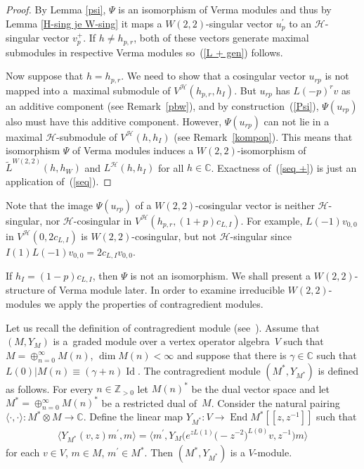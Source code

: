 \documentclass[pdftex]{sigma}
\numberwithin{equation}{section}
\newcommand{\N}{{\mathbb Z}_{> 0} }
\newcommand{\C}{\mathbb C}
\newcommand{\HVir}{\mathcal H}
\begin{document}
\begin{proof}
By Lemma \ref{psi}, $\Psi$ is an isomorphism of Verma modules and thus by Lemma \ref{H-sing je W-sing} it maps a $W(2,2) $-singular vector $u^{\prime}_p$ to an $\HVir$-singular vector $v_p^+$. If $h\neq h_{p,r}$, both of these vectors generate maximal submodules in respective Verma modules so~(\ref{L + gen}) follows.

Now suppose that $h=h_{p,r}$. We need to show that a cosingular vector $u_{rp}$ is not mapped into a~maximal submodule of $V^\HVir(h_{p,r},h_I)$. But $u_{rp}$ has $L(-p) ^{r}v$ as an additive component (see Remark~\ref{pbw}), and by construction~(\ref{Psi}), $\Psi(u_{rp})$ also must have this additive component. However, $\Psi(u_{rp})$ can not lie in a maximal $\HVir$-submodule of $V^{\HVir}(h,h_{I}) $ (see Remark~\ref{kompon}). This means that isomorphism $\Psi$ of Verma modules induces a $W(2,2) $-isomorphism of $\widetilde{L}^{W(2,2)}(h,h_{W}) $ and $L^{\HVir}(h,h_{I}) $ for all $h\in\C$. Exactness of~(\ref{seq +}) is just an application of~(\ref{seq}).
\end{proof}

\begin{Remark}
Note that the image $\Psi(u_{rp}) $ of a $W(2,2)$-cosingular vector is neither $\HVir$-singular, nor $\HVir$-cosingular in $V^{\HVir}(h_{p,r},(1+p)c_{L,I})$. For example, $L(-1) v_{0,0}$ in $V^{\HVir}(0,2c_{L,I})$ is $W(2,2)$-cosingular, but not $\HVir$-singular since $I(1) L(-1) v_{0,0}=2c_{L,I}v_{0,0}$.
\end{Remark}

If $h_{I}=(1-p) c_{L,I}$, then $\Psi $ is not an isomorphism. We shall present a $W(2,2)$-structure of Verma module later. In order to examine irreducible $W(2,2)$-modules we apply the properties of contragredient modules.

Let us recall the def\/inition of contragredient module (see~\cite{FHL}). Assume that $(M,Y_{M})$ is a~graded module over a vertex operator algebra~$V$ such that $M=\oplus _{n=0}^{\infty }M(n)$, $\dim M(n)<\infty $ and suppose that there is $\gamma \in {\C}$ such that $L(0)|M(n)\equiv (\gamma +n)\operatorname{Id}$. The contragredient module $( M^{\ast },Y_{M^{\ast}}) $ is def\/ined as follows. For every $n\in {\N}$ let $M(n)^{\ast }$ be the dual vector space and let $M^{\ast }=\oplus _{n=0}^{\infty }M(n)^{\ast }$ be a restricted dual of~$M$. Consider the natural pairing $\langle \cdot ,\cdot \rangle :M^{\ast }\otimes M\rightarrow \C$. Def\/ine the linear map $Y_{M^{\ast }}\colon V\rightarrow \operatorname{End} M^{\ast }[[z,z^{-1}]]$ such that
\begin{gather}
\langle Y_{M^{\ast }}(v,z)m^{\prime },m\rangle =\big\langle m^{\prime },Y_{M}\big(e^{zL(1)}\big({-}z^{-2}\big)^{L(0)}v,z^{-1}\big)m\big\rangle \label{contra}
\end{gather}
for each $v\in V$, $m\in M$, $m^{\prime }\in M^{\ast }$. Then $(M^{\ast },Y_{M^{\ast }}) $ is a $V$-module.
\end{document}
